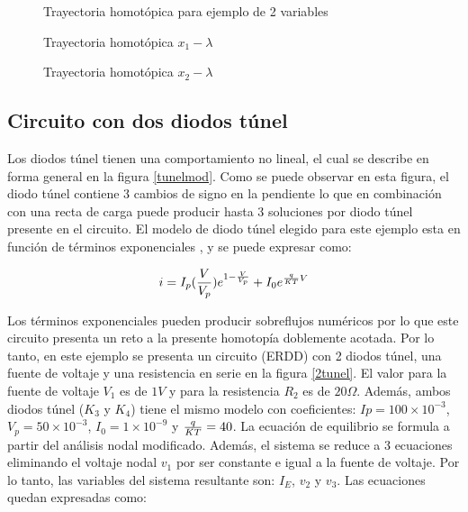 \documentclass[conference,letterpaper,onecolumn]{IEEEtran}
\begin{document}
{\begin{figure}[hbtp]
\centerline{
\epsfxsize=80mm
}
\caption{Trayectoria homot\'opica para ejemplo de 2 variables}
\label{homotex}
\end{figure}

\begin{figure}[hbtp]
\centerline{
\epsfxsize=80mm
}
\caption{Trayectoria homot\'opica $x_1-\lambda$}
\label{xxx1}
\end{figure}

\begin{figure}[hbtp]
\centerline{
\epsfxsize=80mm
}
\caption{Trayectoria homot\'opica $x_2-\lambda$}
\label{xxx2}
\end{figure}



\subsection{Circuito con dos diodos t\'unel}


Los diodos t\'unel tienen una comportamiento no lineal, el
cual se describe en forma general en la figura \ref{tunelmod}.
Como se puede observar en esta figura, el diodo t\'unel
contiene 3 cambios de signo en la pendiente lo que en combinaci\'on con una
recta de carga puede producir hasta 3 soluciones por diodo t\'unel
presente en el circuito. El modelo de diodo t\'unel elegido para este
ejemplo esta en funci\'on de t\'erminos exponenciales
\cite{homo_sze},\cite{homo_shur} y se puede expresar como:

\begin{displaymath}
i=I_p({V \over V_p})e^{1-{V \over V_p}}+I_0e^{{q \over {KT}} V}
\end{displaymath}




Los t\'erminos exponenciales pueden producir sobreflujos num\'ericos por lo que
este circuito
presenta un reto a la presente homotop{\'i}a doblemente acotada.
Por lo tanto, en este ejemplo se presenta un circuito (ERDD)
con 2 diodos t\'unel, una fuente de voltaje y
una resistencia en serie en la figura \ref{2tunel}. El valor para la fuente de voltaje $V_1$ es de $1V$ y para la resistencia  $R_2$ es de $20\Omega$. Adem\'as, ambos diodos t\'unel ($K_3$ y $K_4$) tiene el mismo
modelo con coeficientes:
$Ip=100 \times 10^{-3}$,
$V_p=50 \times 10^{-3} $, $I_0=1\times 10^{-9}$ y ${q \over {KT}} = 40$. La ecuaci\'on de equilibrio se formula a partir del an\'alisis
nodal modificado. Adem\'as, el sistema se reduce a 3 ecuaciones
eliminando el voltaje nodal $v_1$ por ser constante e igual
a la fuente de voltaje. Por lo tanto, las variables del sistema resultante son:
$I_E$, $v_2$ y $v_3$. Las ecuaciones quedan expresadas como:

}
\end{document}
